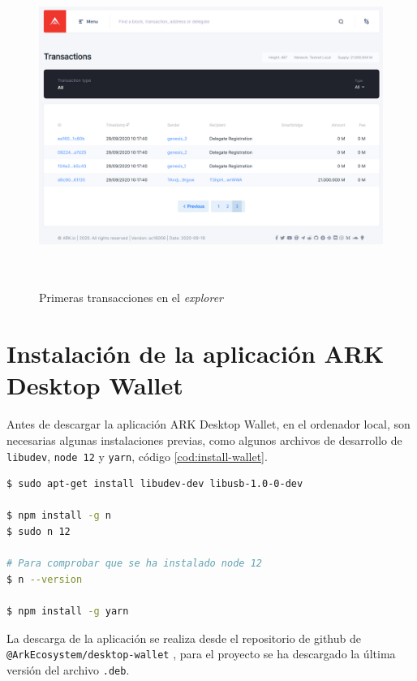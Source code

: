 \begin{figure}[h]
	\centering
	\includegraphics[width=14.5cm,height=10.5cm]{figuras/Navegacion_explorer.png}
	\caption{Primeras transacciones en el \textit{explorer}}
	\label{fig:nav-explorer}
\end{figure}

\clearpage

\section{Instalación de la aplicación ARK Desktop Wallet}

Antes de descargar la aplicación ARK Desktop Wallet, en el ordenador local, son necesarias algunas instalaciones previas, como algunos archivos de desarrollo de \texttt{libudev}, \texttt{node 12} y \texttt{yarn}, código \ref{cod:install-wallet}.

\begin{lstlisting}[language=Bash,caption=Instalaciones previas a la aplicación ARK Wallet, label=cod:install-wallet, style=Consola]
$ sudo apt-get install libudev-dev libusb-1.0-0-dev

$ npm install -g n
$ sudo n 12

# Para comprobar que se ha instalado node 12
$ n --version

$ npm install -g yarn
\end{lstlisting}

La descarga de la aplicación se realiza desde el repositorio de github de \texttt{@ArkEcosystem/desktop-wallet} \cite{descargas-wallet}, para el proyecto se ha descargado la última versión del archivo \texttt{.deb}.

